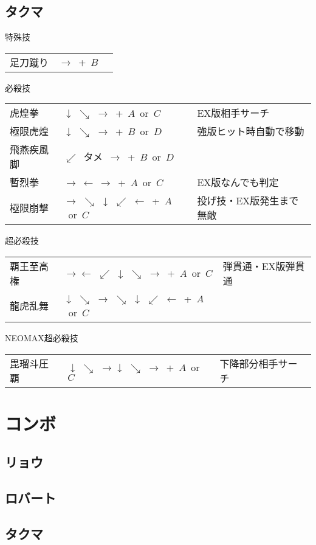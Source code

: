 \documentclass[a4j,11pt]{jarticle}
\def\hien{$\swarrow$\ タメ\ $\rightarrow$}
\def\hado{$\downarrow$ $\searrow$ $\rightarrow$}%
\def\yoga{$\leftarrow$ $\swarrow$ $\downarrow$ $\searrow$ $\rightarrow$}%
\def\gyakuyoga{$\rightarrow$ $\searrow$ $\downarrow$ $\swarrow$ $\leftarrow$}%
\def\ryuko{$\downarrow$ $\searrow$ $\rightarrow$ $\searrow$ $\downarrow$ $\swarrow$ $\leftarrow$}%
\begin{document}
\subsection{タクマ}
\begin{itembox}[l]{特殊技}
\begin{tabular}{lll}
足刀蹴り&$\rightarrow$\ +\ $B$&%
\end{tabular}
\end{itembox}
\begin{itembox}[l]{必殺技}
\begin{tabular}{lll}
虎煌拳&\hado\ +\ $A$\ or\ $C$&EX版相手サーチ\\%
極限虎煌&\hado\ +\ $B$\ or\ $D$&強版ヒット時自動で移動\\%
飛燕疾風脚&\hien\ +\ $B$\ or\ $D$&\\%
暫烈拳&$\rightarrow\ \leftarrow\ \rightarrow$\ +\ $A$\ or\ $C$&EX版なんでも判定\\%
極限崩撃&\gyakuyoga\ +\ $A$\ or\ $C$&投げ技・EX版発生まで無敵%
\end{tabular}
\end{itembox}
\begin{itembox}[l]{超必殺技}
\begin{tabular}{lll}
覇王至高権&$\rightarrow$\yoga\ +\ $A$\ or\ $C$&弾貫通・EX版弾貫通\times 3\\%
龍虎乱舞&\ryuko\ +\ $A$\ or\ $C$&%
\end{tabular}
\end{itembox}
\begin{itembox}[l]{NEOMAX超必殺技}
\begin{tabular}{lll}
毘瑠斗圧覇&\hado\hado\ +\ $A$\ or\ $C$&下降部分相手サーチ%
\end{tabular}
\end{itembox}
\newpage
\section{コンボ}
\subsection{リョウ}
\subsection{ロバート}
\subsection{タクマ}
\newpage
\end{document}
